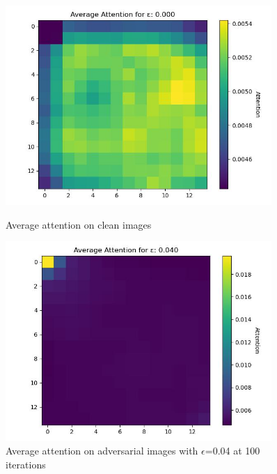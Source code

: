 \begin{figure}[h]
    \centering
    \begin{minipage}{0.45\textwidth}
        \centering
        \includegraphics[width=0.9\textwidth]{figures/distraction_attention_epsilon_0.png} %
        \caption{Average attention on clean images}
        \label{average_attention_clean}
    \end{minipage}\hfill
    \begin{minipage}{0.45\textwidth}
        \centering
        \includegraphics[width=0.9\textwidth]{figures/distraction_attention_epsilon_0.04.png} %
        \caption{Average attention on adversarial images with $\epsilon$=0.04 at 100 iterations}
        \label{average_attention_adv}
    \end{minipage}
\end{figure}

